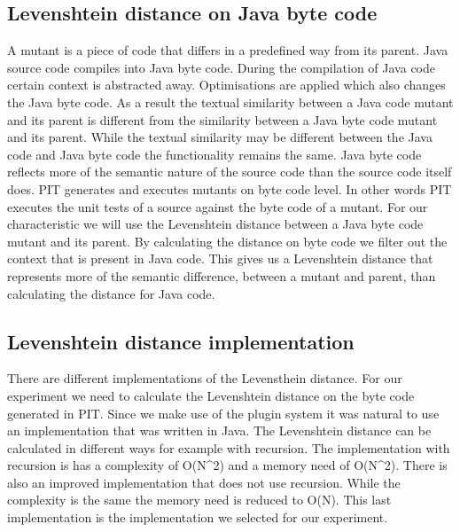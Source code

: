 \documentclass[../../main]{subfiles}
\begin{document}
\subsection{Levenshtein distance on Java byte code}
A mutant is a piece of code that differs in a predefined way from its parent.
Java source code compiles into Java byte code.
During the compilation of Java code certain context is abstracted away\cite{byteCodeEngineering}.
Optimisations are applied which also changes the Java byte code\cite{byteCodeEngineering}.
As a result the textual similarity between a Java code mutant and its parent is different from the similarity between a Java byte code mutant and its parent.
While the textual similarity may be different between the Java code and Java byte code the functionality remains the same.
Java byte code reflects more of the semantic nature of the source code than the source code itself does. 
PIT generates and executes mutants on byte code level\cite{pitestBytecode}. 
In other words PIT executes the unit tests of a source against the byte code of a mutant.
\newline
For our characteristic we will use the Levenshtein distance between a Java byte code mutant and its parent.
By calculating the distance on byte code we filter out the context that is present in Java code.
This gives us a Levenshtein distance that represents more of the semantic difference, between a mutant and parent, than calculating the distance for Java code.


\subsection{Levenshtein distance implementation}
There are different implementations of the Levensthein distance.
For our experiment we need to calculate the Levenshtein distance on the byte code generated in PIT.
Since we make use of the plugin system it was natural to use an implementation that was written in Java.
The Levenshtein distance can be calculated in different ways for example with recursion.
The implementation with recursion is has a complexity of O(N\^{}2) and a memory need of O(N\^{}2).
There is also an improved implementation that does not use recursion.
While the complexity is the same the memory need is reduced to O(N).
This last implementation is the implementation we selected for our experiment.
\end{document}
